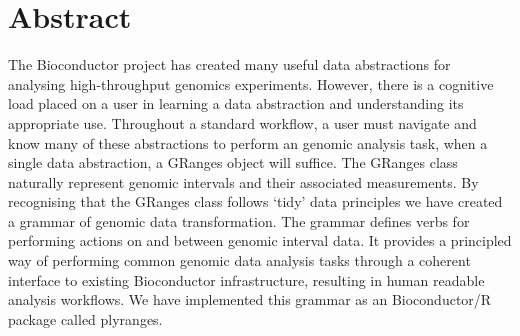 \documentclass[10pt,letterpaper]{article}
\date{}
\newcommand{\getIndex}[2]{
  \ForEach{,}{\IfEq{#1}{\thislevelitem}{\number\thislevelcount\ExitForEach}{}}{#2}
}
\newcommand{\getAff}[1]{
  \getIndex{#1}{Monash University,Genentech}
}
\begin{document}
\vspace*{0.2in}

\section*{Abstract}
The Bioconductor project has created many useful data abstractions for
analysing high-throughput genomics experiments. However, there is a
cognitive load placed on a user in learning a data abstraction and
understanding its appropriate use. Throughout a standard workflow, a
user must navigate and know many of these abstractions to perform an
genomic analysis task, when a single data abstraction, a GRanges object
will suffice. The GRanges class naturally represent genomic intervals
and their associated measurements. By recognising that the GRanges class
follows `tidy' data principles we have created a grammar of genomic data
transformation. The grammar defines verbs for performing actions on and
between genomic interval data. It provides a principled way of
performing common genomic data analysis tasks through a coherent
interface to existing Bioconductor infrastructure, resulting in human
readable analysis workflows. We have implemented this grammar as an
Bioconductor/R package called plyranges.

\end{document}

